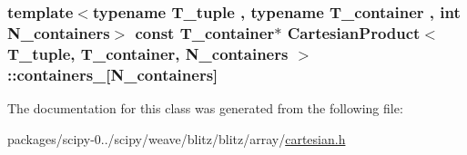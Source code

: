 \subsubsection[{containers\+\_\+}]{\setlength{\rightskip}{0pt plus 5cm}template$<$typename T\+\_\+tuple , typename T\+\_\+container , int N\+\_\+containers$>$ const T\+\_\+container$\ast$ {\bf Cartesian\+Product}$<$ T\+\_\+tuple, T\+\_\+container, N\+\_\+containers $>$\+::containers\+\_\+\mbox{[}N\+\_\+containers\mbox{]}\hspace{0.3cm}{\ttfamily [protected]}}\label{classCartesianProduct_ac4774e32da9a3fa3dcd50640379f4645}


The documentation for this class was generated from the following file\+:\begin{DoxyCompactItemize}
\item 
packages/scipy-\/0../scipy/weave/blitz/blitz/array/\hyperlink{cartesian_8h}{cartesian.\+h}\end{DoxyCompactItemize}
